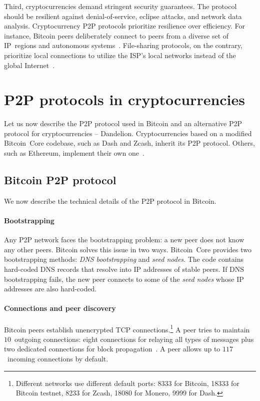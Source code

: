 Third, cryptocurrencies demand stringent security guarantees.
The protocol should be resilient against denial-of-service, eclipse attacks, and network data analysis.
Cryptocurrency P2P protocols prioritize resilience over efficiency.
For instance, Bitcoin peers deliberately connect to peers from a diverse set of IP~regions and autonomous systems~\cite{Naumenko2019a}.
File-sharing protocols, on the contrary, prioritize local connections to utilize the ISP's local networks instead of the global Internet~\cite{Yoshida2012,Wang2012}.


\section{P2P protocols in cryptocurrencies}

Let us now describe the P2P protocol used in Bitcoin and an alternative P2P protocol for cryptocurrencies -- Dandelion.
Cryptocurrencies based on a modified Bitcoin~Core codebase, such as Dash and Zcash, inherit its P2P protocol.
Others, such as Ethereum, implement their own one~\cite{Henningsen2019}.

\subsection{Bitcoin P2P protocol}
\label{sec:BitcoinP2PProtocol}

We now describe the technical details of the P2P protocol in Bitcoin.

\paragraph{Bootstrapping}

Any P2P network faces the bootstrapping problem: a new peer does not know any other peers.
Bitcoin solves this issue in two ways.
Bitcoin~Core provides two bootstrapping methods: \textit{DNS bootstrapping} and \textit{seed nodes}.
The code contains hard-coded DNS records that resolve into IP addresses of stable peers.
If DNS bootstrapping fails, the new peer connects to some of the \textit{seed nodes} whose IP addresses are also hard-coded.


\paragraph{Connections and peer discovery}

Bitcoin peers establish unencrypted TCP connections.\footnote{Different networks use different default ports: 8333 for Bitcoin, 18333 for Bitcoin testnet, 8233 for Zcash, 18080 for Monero, 9999 for Dash.}
A peer tries to maintain $10$~outgoing connections: eight connections for relaying all types of messages plus two dedicated connections for block propagation~\cite{Daftuar2019}.
A peer allows up to $117$~incoming connections by default.

